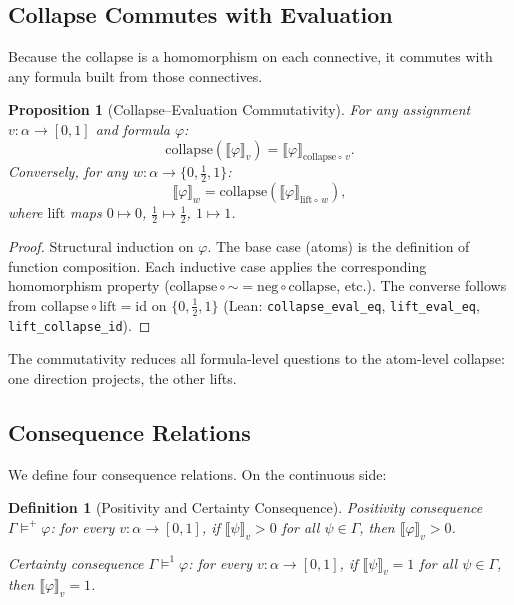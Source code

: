 \documentclass[11pt,a4paper]{article}
\newtheorem{proposition}[theorem]{Proposition}
\newtheorem{definition}[theorem]{Definition}
\newcommand{\negc}{\mathord{\sim}}
\begin{document}
\subsection{Collapse Commutes with Evaluation}
\label{sec:collapse-eval}

Because the collapse is a homomorphism on each connective, it
commutes with any formula built from those connectives.

\begin{proposition}[Collapse--Evaluation Commutativity]
\label{prop:collapse-eval}
For any assignment $v : \alpha \to [0,1]$ and formula $\varphi$:
\[
\mathrm{collapse}(\llbracket\varphi\rrbracket_v)
  = \llbracket\varphi\rrbracket_{\mathrm{collapse} \circ\, v}.
\]
Conversely, for any $w : \alpha \to \{0, \tfrac{1}{2}, 1\}$:
\[
\llbracket\varphi\rrbracket_w
  = \mathrm{collapse}(\llbracket\varphi\rrbracket_{\mathrm{lift}
    \circ\, w}),
\]
where $\mathrm{lift}$ maps $0 \mapsto 0$,
$\tfrac{1}{2} \mapsto \tfrac{1}{2}$, $1 \mapsto 1$.
\end{proposition}

\begin{proof}
Structural induction on $\varphi$.
The base case (atoms) is the definition of function composition.
Each inductive case applies the corresponding homomorphism property
($\mathrm{collapse} \circ \negc = \mathrm{neg} \circ
\mathrm{collapse}$, etc.).
The converse follows from $\mathrm{collapse} \circ \mathrm{lift}
= \mathrm{id}$ on $\{0, \tfrac{1}{2}, 1\}$
(Lean: \texttt{collapse\_eval\_eq}, \texttt{lift\_eval\_eq},
\texttt{lift\_collapse\_id}).
\end{proof}

The commutativity reduces all formula-level questions to the
atom-level collapse: one direction projects, the other lifts.

\subsection{Consequence Relations}
\label{sec:consequence}

We define four consequence relations.
On the continuous side:

\begin{definition}[Positivity and Certainty Consequence]
\label{def:pos-cert}
\emph{Positivity consequence}
$\Gamma \models^+ \varphi$: for every $v : \alpha \to [0,1]$,
if $\llbracket\psi\rrbracket_v > 0$ for all $\psi \in \Gamma$,
then $\llbracket\varphi\rrbracket_v > 0$.

\emph{Certainty consequence}
$\Gamma \models^1 \varphi$: for every $v : \alpha \to [0,1]$,
if $\llbracket\psi\rrbracket_v = 1$ for all $\psi \in \Gamma$,
then $\llbracket\varphi\rrbracket_v = 1$.
\end{definition}
\end{document}
